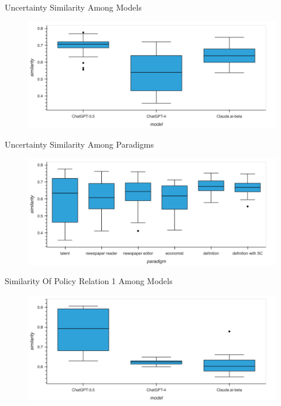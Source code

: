 \documentclass[12pt]{beamer}
\begin{document}
\begin{frame}{Uncertainty Similarity Among Models}
\begin{figure}[H]
\centering
\includegraphics[width=11.5cm]{Figures/fig25.png}
\end{figure}
\end{frame}


\begin{frame}{Uncertainty Similarity Among Paradigms}
\begin{figure}[H]
\centering
\includegraphics[width=11.5cm]{Figures/fig26.png}
\end{figure}
\end{frame}


\begin{frame}{Similarity Of Policy Relation 1 Among Models}
\begin{figure}[H]
\centering
\includegraphics[width=11.5cm]{Figures/fig27.png}
\end{figure}
\end{frame}
\end{document}
